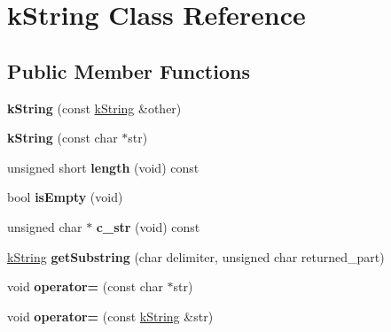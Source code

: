 \hypertarget{classkString}{}\section{k\+String Class Reference}
\label{classkString}
\subsection*{Public Member Functions}
\begin{DoxyCompactItemize}
\item 
{\bfseries k\+String} (const \hyperlink{classkString}{k\+String} \&other)\hypertarget{classkString_a723ed0f36a930c34e1f377422dc6cb87}{}\label{classkString_a723ed0f36a930c34e1f377422dc6cb87}

\item 
{\bfseries k\+String} (const char $\ast$str)\hypertarget{classkString_a34ba9c86d2cbcdd64af7f85e02881514}{}\label{classkString_a34ba9c86d2cbcdd64af7f85e02881514}

\item 
unsigned short {\bfseries length} (void) const \hypertarget{classkString_afcf0a1db915e2de54622e203d45ef31c}{}\label{classkString_afcf0a1db915e2de54622e203d45ef31c}

\item 
bool {\bfseries is\+Empty} (void)\hypertarget{classkString_ac17f389b5b95b86e014d75e4e1f17d60}{}\label{classkString_ac17f389b5b95b86e014d75e4e1f17d60}

\item 
unsigned char $\ast$ {\bfseries c\+\_\+str} (void) const \hypertarget{classkString_ad2b0506e7c45c88a6f48713b7fd9dbe2}{}\label{classkString_ad2b0506e7c45c88a6f48713b7fd9dbe2}

\item 
\hyperlink{classkString}{k\+String} {\bfseries get\+Substring} (char delimiter, unsigned char returned\+\_\+part)\hypertarget{classkString_a57cd7485bb48d98f4bdc774473d3eeab}{}\label{classkString_a57cd7485bb48d98f4bdc774473d3eeab}

\item 
void {\bfseries operator=} (const char $\ast$str)\hypertarget{classkString_a01694244979403aa17c4d3e4bd43393d}{}\label{classkString_a01694244979403aa17c4d3e4bd43393d}

\item 
void {\bfseries operator=} (const \hyperlink{classkString}{k\+String} \&str)\hypertarget{classkString_a7e4e68f3b38f121fe5fc4a0b8bdb2649}{}\label{classkString_a7e4e68f3b38f121fe5fc4a0b8bdb2649}


\end{DoxyCompactItemize}
